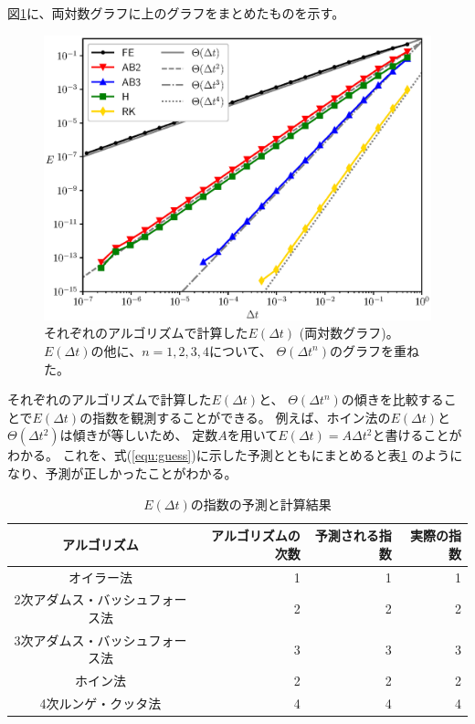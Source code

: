 \documentclass[a4j, titlepage]{jsarticle}
\numberwithin{equation}{section}
\begin{document}
            図\ref{fig:3}に、両対数グラフに上のグラフをまとめたものを示す。
            \begin{figure}[h]
                \centering
                \includegraphics[width=0.8\hsize]{kadai3/kadai3.eps}
                \caption{
                    それぞれのアルゴリズムで計算した$E(\Delta t)$ (両対数グラフ)。
                    $E(\Delta t)$の他に、$n=1,2,3,4$について、
                    $\Theta(\Delta t^n)$のグラフを重ねた。
                }
                \label{fig:3}
            \end{figure}
            それぞれのアルゴリズムで計算した$E(\Delta t)$と、
            $\Theta(\Delta t^n)$の傾きを比較することで$E(\Delta t)$の指数を観測することができる。
            例えば、ホイン法の$E(\Delta t)$と$\Theta(\Delta t^2)$は傾きが等しいため、
            定数$A$を用いて$E(\Delta t) = A\Delta t^2$と書けることがわかる。
            これを、式(\ref{equ:guess})に示した予測とともにまとめると表\ref{tab:3}
            のようになり、予測が正しかったことがわかる。

            \begin{table}[h]
                \centering
                \caption{
                    $E(\Delta t)$の指数の予測と計算結果
                }
                \label{tab:3}
                \begin{tabular}{c|rrr} \hline
                    アルゴリズム & アルゴリズムの次数 & 予測される指数 & 実際の指数 \\ \hline \hline
                    オイラー法 & 1 & 1 & 1 \\
                    2次アダムス・バッシュフォース法 & 2 & 2 & 2 \\
                    3次アダムス・バッシュフォース法 & 3 & 3 & 3 \\
                    ホイン法 & 2 & 2 & 2 \\
                    4次ルンゲ・クッタ法 & 4 & 4 & 4 \\ \hline
                \end{tabular}
            \end{table}
\end{document}

